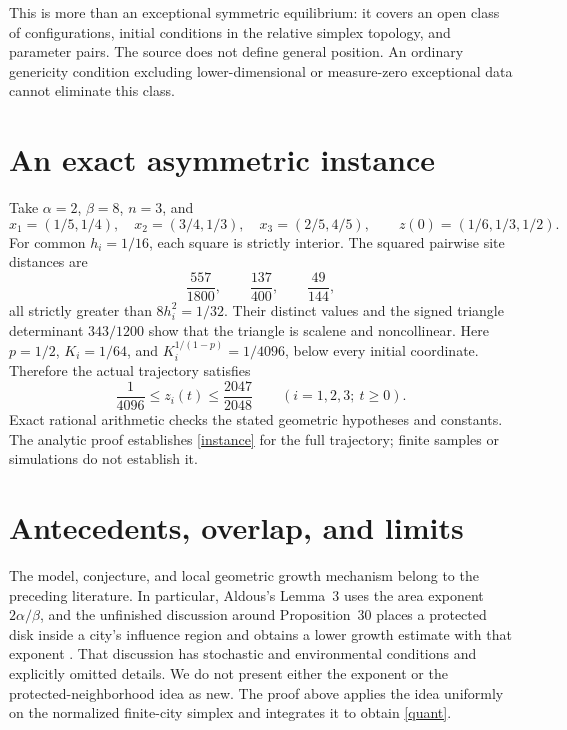 \documentclass[11pt]{article}
\begin{document}
This is more than an exceptional symmetric equilibrium: it covers an open class of configurations, initial conditions in the relative simplex topology, and parameter pairs. The source does not define general position. An ordinary genericity condition excluding lower-dimensional or measure-zero exceptional data cannot eliminate this class.

\section{An exact asymmetric instance}

Take $\alpha=2$, $\beta=8$, $n=3$, and
\[
 x_1=(1/5,1/4),\quad x_2=(3/4,1/3),\quad x_3=(2/5,4/5),
 \qquad z(0)=(1/6,1/3,1/2).
\]
For common $h_i=1/16$, each square is strictly interior. The squared pairwise site distances are
\[
 \frac{557}{1800},\qquad\frac{137}{400},\qquad\frac{49}{144},
\]
all strictly greater than $8h_i^2=1/32$. Their distinct values and the signed triangle determinant $343/1200$ show that the triangle is scalene and noncollinear. Here $p=1/2$, $K_i=1/64$, and $K_i^{1/(1-p)}=1/4096$, below every initial coordinate. Therefore the actual trajectory satisfies
\begin{equation}
 \frac1{4096}\leq z_i(t)\leq\frac{2047}{2048}
 \qquad(i=1,2,3;\ t\geq0).\label{instance}
\end{equation}
Exact rational arithmetic checks the stated geometric hypotheses and constants. The analytic proof establishes \eqref{instance} for the full trajectory; finite samples or simulations do not establish it.

\section{Antecedents, overlap, and limits}

The model, conjecture, and local geometric growth mechanism belong to the preceding literature. In particular, Aldous's Lemma~3 uses the area exponent $2\alpha/\beta$, and the unfinished discussion around Proposition~30 places a protected disk inside a city's influence region and obtains a lower growth estimate with that exponent \cite[pp.~9, 36--37]{Ald07}. That discussion has stochastic and environmental conditions and explicitly omitted details. We do not present either the exponent or the protected-neighborhood idea as new. The proof above applies the idea uniformly on the normalized finite-city simplex and integrates it to obtain \eqref{quant}.
\end{document}
